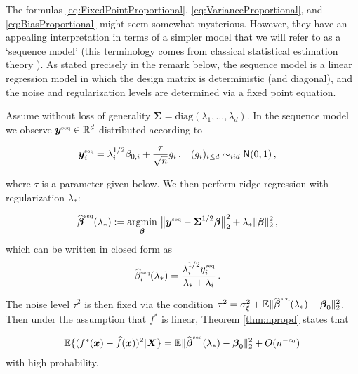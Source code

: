 The formulas \eqref{eq:FixedPointProportional},
\eqref{eq:VarianceProportional}, and \eqref{eq:BiasProportional}
might seem somewhat mysterious. However, they have an appealing interpretation in terms of a simpler model that we will refer to as a `sequence model' (this terminology comes from classical statistical estimation theory \cite{johnstone2019book}). As stated precisely in the remark below, the sequence model is a linear regression model in which the design matrix is deterministic (and diagonal), and the noise and regularization levels are  determined via a fixed point equation. 
\begin{remark}
Assume without loss of generality ${\boldsymbol \Sigma} = \text{diag}(\lambda_1,\dots,\lambda_d)$.
In the sequence model we observe ${\boldsymbol y}^{\mbox{\rm\tiny seq}}\in{\mathbb R}^d$ distributed according to

\begin{align}
  {\boldsymbol y}_i^{\mbox{\rm\tiny seq}} & = \lambda_i^{1/2}\beta_{0,i}+\frac{\tau}{\sqrt{n}}g_i \, ,\;\;\;   (g_i)_{i\le d}\sim_{iid}{\sf N}(0,1)\, ,
\end{align}

where $\tau$ is a parameter given below. We then perform ridge regression with regularization $\lambda_*$:

\begin{align}

  \widehat{\boldsymbol \beta}^{\mbox{\rm\tiny seq}}(\lambda_*)& :=\underset{{\boldsymbol \beta}}{\mathrm{argmin}} \   \big\|{\boldsymbol y}^{\mbox{\rm\tiny seq}}-{\boldsymbol \Sigma}^{1/2}{\boldsymbol \beta}\big\|_2^2+\lambda_*\|{\boldsymbol \beta}\|^2_2\, ,
\end{align}
which can be written in closed form as
\begin{align} 
  \widehat{\beta}^{\mbox{\rm\tiny seq}}_i(\lambda_*)& = \frac{\lambda_i^{1/2} y^{\mbox{\rm\tiny seq}}_i}{\lambda_*+\lambda_i}\, .

\end{align}

The noise level $\tau^2$ is then fixed via the condition
$\tau^2 = \sigma_\xi^2+\mathbb{E} \|
\widehat{\boldsymbol \beta}^{\mbox{\rm\tiny seq}}(\lambda_*)-{\boldsymbol \beta}_0\|_2^2$. Then under the assumption that $f^*$ is linear, Theorem \ref{thm:npropd} states that

\begin{align}

  \mathbb{E}\{(f^*({\boldsymbol x})-{\widehat f}({\boldsymbol x}))^2|{\boldsymbol X}\} =  \mathbb{E} \|  \widehat{\boldsymbol \beta}^{\mbox{\rm\tiny seq}}(\lambda_*)-{\boldsymbol \beta}_0\|_2^2 +O(n^{-c_0})

\end{align}
with high probability.
\end{remark}

